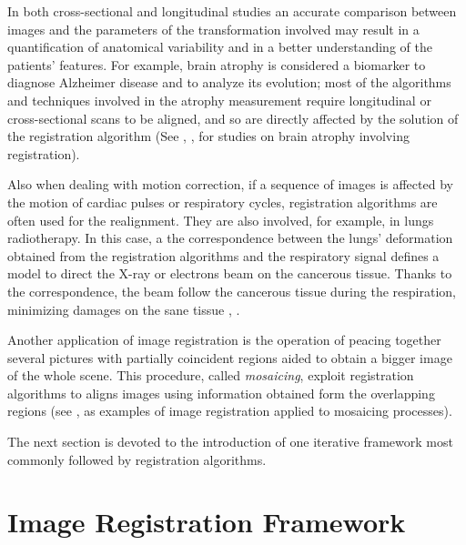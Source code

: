 In both cross-sectional and longitudinal studies an accurate comparison between images and the parameters of the transformation involved may result in a quantification of anatomical variability and in a better understanding of the patients' features. 
%
For example, brain atrophy is considered a biomarker to diagnose Alzheimer disease and to analyze its evolution; most of the algorithms and techniques involved in the atrophy measurement require longitudinal or cross-sectional scans to be aligned, and so are directly affected by the solution of the registration algorithm (See \cite{prados2015measuring} \cite{fox1997brain}, \cite{gauthier2012prevention}, for studies on brain atrophy involving registration). 

Also when dealing with motion correction, if a sequence of images is affected by the motion of cardiac pulses or respiratory cycles, registration algorithms are often used for the realignment. 
They are also involved, for example, in lungs radiotherapy. In this case, a the correspondence between the lungs' deformation obtained from the registration algorithms and the respiratory signal defines a model to direct the X-ray or electrons beam on the cancerous tissue. Thanks to the correspondence, the beam follow the cancerous tissue during the respiration, minimizing damages on the sane tissue \cite{mcclelland}, \cite{mcclelland2011inter}.

Another application of image registration is the operation of peacing together several pictures with partially coincident regions aided to obtain a bigger image of the whole scene. This procedure, called \emph{mosaicing}, exploit registration algorithms to aligns images using information obtained form the overlapping regions (see \cite{vercauteren2006robust}, \cite{szeliski1994image} as examples of image registration applied to mosaicing processes).

The next section is devoted to the introduction of one iterative framework most commonly followed by registration algorithms.


\section{Image Registration Framework}\label{se:registration_framework}

